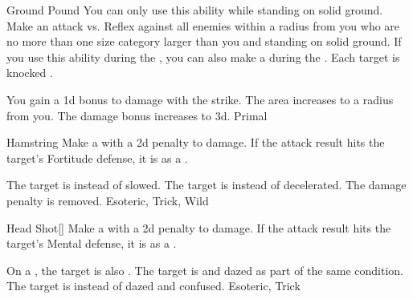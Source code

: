 \lowercase{\hypertarget{maneuver:Ground Pound}{}}\label{maneuver:Ground Pound}
\hypertarget{maneuver:Ground Pound}{}
\begin{freeability}{Ground Pound}
You can only use this ability while standing on solid ground.
Make an attack vs. Reflex against all enemies within a \areasmall radius from you who are no more than one size category larger than you and standing on solid ground.
If you use this ability during the , you can also make a  during the .
\hit Each target is knocked \prone.

\rankline
{} You gain a \plus1d bonus to damage with the strike.
 The area increases to a \arealarge radius from you.
 The damage bonus increases to \plus3d.
 Primal
\end{freeability}
\vspace{0.25em}



\lowercase{\hypertarget{maneuver:Hamstring}{}}\label{maneuver:Hamstring}
\hypertarget{maneuver:Hamstring}{}
\begin{freeability}{Hamstring}
Make a  with a \minus2d penalty to damage.
If the attack result hits the target's Fortitude defense,
it is  as a .

\rankline
{} The target is  instead of slowed.
 The target is  instead of decelerated.
 The damage penalty is removed.
 Esoteric, Trick, Wild
\end{freeability}
\vspace{0.25em}



\lowercase{\hypertarget{maneuver:Head Shot}{}}\label{maneuver:Head Shot}
\hypertarget{maneuver:Head Shot}{}
\begin{freeability}{Head Shot}[]
Make a  with a \minus2d penalty to damage.
If the attack result hits the target's Mental defense,
it is  as a .

\rankline
{} On a , the target is also .
 The target is  and dazed as part of the same condition.
 The target is  instead of dazed and confused.
 Esoteric, Trick
\end{freeability}
\vspace{0.25em}



